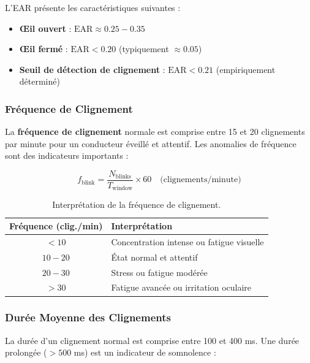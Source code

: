 \documentclass[12pt,a4paper,twoside]{report}
\newcommand{\keyword}[1]{\textbf{\textcolor{stellantisblue}{#1}}}
\begin{document}
L'EAR présente les caractéristiques suivantes :
\begin{itemize}
    \item \textbf{Œil ouvert} : $\text{EAR} \approx 0.25 - 0.35$
    \item \textbf{Œil fermé} : $\text{EAR} < 0.20$ (typiquement $\approx 0.05$)
    \item \textbf{Seuil de détection de clignement} : $\text{EAR} < 0.21$ (empiriquement déterminé)
\end{itemize}

\subsubsection{Fréquence de Clignement}

La \keyword{fréquence de clignement} normale est comprise entre 15 et 20 clignements par minute pour un conducteur éveillé et attentif. Les anomalies de fréquence sont des indicateurs importants :

\begin{equation}
f_{\text{blink}} = \frac{N_{\text{blinks}}}{T_{\text{window}}} \times 60 \quad \text{(clignements/minute)}
\label{eq:blink_freq}
\end{equation}

\begin{table}[H]
\centering
\caption{Interprétation de la fréquence de clignement.}
\label{tab:blink_freq}
\renewcommand{\arraystretch}{1.3}
\begin{tabular}{|c|l|}
\hline
\rowcolor{stellantisblue!15}
\textbf{Fréquence (clig./min)} & \textbf{Interprétation} \\
\hline
$< 10$ & Concentration intense ou fatigue visuelle \\
\hline
$10 - 20$ & État normal et attentif \\
\hline
$20 - 30$ & Stress ou fatigue modérée \\
\hline
$> 30$ & Fatigue avancée ou irritation oculaire \\
\hline
\end{tabular}
\end{table}

\subsubsection{Durée Moyenne des Clignements}

La durée d'un clignement normal est comprise entre 100 et 400 ms. Une durée prolongée ($> 500$ ms) est un indicateur de somnolence :
\end{document}
